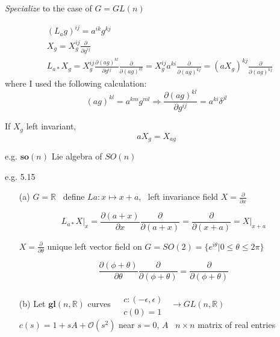 \documentclass[twoside]{amsart}
\begin{document}
\emph{Specialize} to the case of $G = GL(n)$

\[
\begin{aligned}
  & (L_ag)^{ij} = a^{ik} g^{kj} \\ 
  & X_g = X^{ij}_g \frac{ \partial }{ \partial g^{ij} } \\ 
  & L_{a*} X_g = X^{ij}_g \frac{ \partial (ag)^{kl} }{ \partial g^{ij}} \frac{ \partial }{ \partial (ag)^{kl} } = X^{ij}_g a^{ki} \frac{ \partial }{ \partial (ag)^{kj} } = (aX_g)^{kj} \frac{ \partial }{ \partial (ag)^{kj}}
\end{aligned}
\]
where I used the following calculation:
\[
(ag)^{kl} = a^{km} g^{ml} \Longrightarrow \frac{ \partial (ag)^{kl}}{ \partial g^{ij}} = a^{ki} \delta^{jl}
\]

If $X_g$ left invariant,
\[
aX_g=X_{ag}
\]



\hrulefill

e.g. $\mathbf{so}(n)$ Lie algebra of $SO(n)$

e.g. 5.15 
\begin{enumerate}
\item[(a)] $G = \mathbb{R}$  \quad \quad \, define $La : x \mapsto x + a$,  \quad \, left invariance field $X = \frac{ \partial }{ \partial x }$  

\[
L_{a*} \left. X \right|_x = \frac{ \partial (a+x) }{ \partial x} \frac{ \partial }{ \partial (a+ x) } = \frac{ \partial }{ \partial (x+a) } = \left. X \right|_{x+a}
\]

$X = \frac{ \partial }{ \partial \theta}$ \quad unique left vector field on $G = SO(2) = \lbrace e^{i \theta} | 0 \leq \theta \leq 2 \pi \rbrace$ 

\[
\frac{ \partial ( \phi + \theta ) }{ \partial \theta } \frac{ \partial }{ \partial (\phi + \theta ) } = \frac{ \partial }{ \partial ( \phi + \theta ) }
\]

\item[(b)] Let $\mathbf{gl}{ (n, \mathbb{R})}$   \quad curves $\begin{aligned} & \quad \\ 
  & c : (-\epsilon , \epsilon ) \\ 
  & c(0 ) = 1 \end{aligned}$ $ \, \to GL(n, \mathbb{R})$ \quad \quad $c(s) = 1 + sA + \mathcal{O}(s^2)$ \quad near $s=0$, $A$ \, $n\times n$ matrix of real entries 
\end{enumerate}
\end{document}
